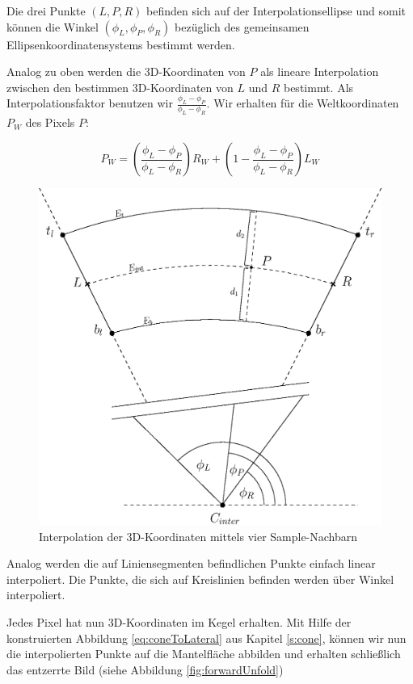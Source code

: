 Die drei Punkte $(L, P, R)$ befinden sich auf der Interpolationsellipse und somit können die  Winkel $(\phi_L, \phi_P, \phi_R)$ bezüglich des gemeinsamen Ellipsenkoordinatensystems bestimmt werden.

Analog zu oben werden die 3D-Koordinaten von $P$ als lineare Interpolation zwischen den bestimmen 3D-Koordinaten von $L$ und $R$ bestimmt. Als Interpolationsfaktor benutzen wir
$\frac{\phi_L - \phi_P}{\phi_L - \phi_R}$. Wir erhalten für die Weltkoordinaten $P_W$ des Pixels $P$:

\[
P_W = \left(\frac{\phi_L - \phi_P}{\phi_L - \phi_R}\right) R_W + \left(1 - \frac{\phi_L - \phi_P}{\phi_L - \phi_R}\right) L_W
\]



\begin{figure}[!htb]
	\centering
	\includegraphics[scale=.6]{images/radialInterpolation.eps}
	\caption{Interpolation der 3D-Koordinaten mittels vier Sample-Nachbarn}
	\label{fig:radialInterpolation}
\end{figure}



Analog werden die auf Liniensegmenten befindlichen Punkte einfach linear interpoliert. Die Punkte, die sich auf Kreislinien befinden werden über Winkel interpoliert.

Jedes Pixel hat nun 3D-Koordinaten im Kegel erhalten. Mit Hilfe der konstruierten Abbildung \ref{eq:coneToLateral} aus Kapitel \ref{s:cone}, können wir nun die interpolierten Punkte auf die Mantelfläche abbilden und erhalten schließlich das entzerrte Bild (siehe Abbildung \ref{fig:forwardUnfold})



